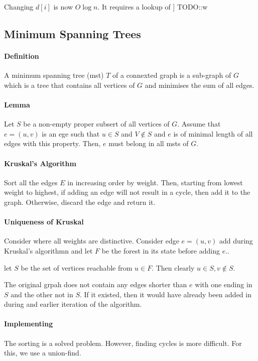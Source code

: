 Changing \(d[i]\) is now \(O\log n\). It requires a lookup of ]
TODO::w

\subsection{Minimum Spanning Trees}

\paragraph{Definition}
A minimum spanning tree (mst) \(T\) of a connexted graph is a sub-graph
of \(G\) which is a tree that contains all vertices of \(G\) and minimises
the sum of all edges.

\paragraph{Lemma}
Let \(S\) be a non-empty proper subsert of all vertices of \(G\).
Assume that \(e = (u, v)\) is an ege such that \(u \in S\)
and \(V \not\in S\) and \(e\) is of minimal length of all edges with this
property. Then, \(e\) must belong in all msts of \(G\).

\paragraph{Kruskal's Algorithm}
Sort all the edges \(E\) in increasing order by weight.
Then, starting from lowest weight to highest, if adding an edge will
not result in a cycle, then add it to the graph. Otherwise, discard the edge
and return it.

\paragraph{Uniqueness of Kruskal}
Consider where all weights are distinctive. Consider edge \(e = (u, v)\)
add during Kruskal's algorithmn and let \(F\) be the forest in its state before
adding \(e\)..

let \(S\) be the set of vertices reachable from \(u \in F\). Then clearly
\(u \in S, v\not\in S\).

The original grpah does not contain any edges shorter than \(e\) with one ending
in \(S\) and the other not in \(S\). If it existed, then it would have
already been added in during and earlier iteration of the algorithm.

\paragraph{Implementing}
The sorting is a solved problem. However, finding cycles is more difficult.
For this, we use a union-find.

